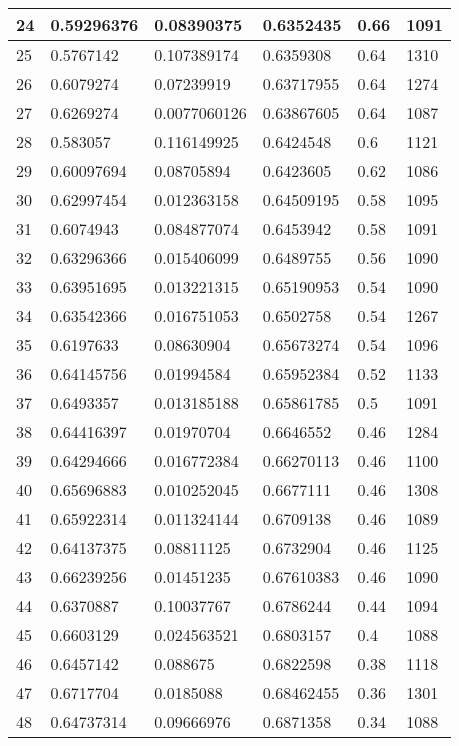\begin{longtable}{|l|l|l|l|l|l|}
24 & 0.59296376 & 0.08390375 & 0.6352435 & 0.66 & 1091 \\ \hline 
25 & 0.5767142 & 0.107389174 & 0.6359308 & 0.64 & 1310 \\ \hline 
26 & 0.6079274 & 0.07239919 & 0.63717955 & 0.64 & 1274 \\ \hline 
27 & 0.6269274 & 0.0077060126 & 0.63867605 & 0.64 & 1087 \\ \hline 
28 & 0.583057 & 0.116149925 & 0.6424548 & 0.6 & 1121 \\ \hline 
29 & 0.60097694 & 0.08705894 & 0.6423605 & 0.62 & 1086 \\ \hline 
30 & 0.62997454 & 0.012363158 & 0.64509195 & 0.58 & 1095 \\ \hline 
31 & 0.6074943 & 0.084877074 & 0.6453942 & 0.58 & 1091 \\ \hline 
32 & 0.63296366 & 0.015406099 & 0.6489755 & 0.56 & 1090 \\ \hline 
33 & 0.63951695 & 0.013221315 & 0.65190953 & 0.54 & 1090 \\ \hline 
34 & 0.63542366 & 0.016751053 & 0.6502758 & 0.54 & 1267 \\ \hline 
35 & 0.6197633 & 0.08630904 & 0.65673274 & 0.54 & 1096 \\ \hline 
36 & 0.64145756 & 0.01994584 & 0.65952384 & 0.52 & 1133 \\ \hline 
37 & 0.6493357 & 0.013185188 & 0.65861785 & 0.5 & 1091 \\ \hline 
38 & 0.64416397 & 0.01970704 & 0.6646552 & 0.46 & 1284 \\ \hline 
39 & 0.64294666 & 0.016772384 & 0.66270113 & 0.46 & 1100 \\ \hline 
40 & 0.65696883 & 0.010252045 & 0.6677111 & 0.46 & 1308 \\ \hline 
41 & 0.65922314 & 0.011324144 & 0.6709138 & 0.46 & 1089 \\ \hline 
42 & 0.64137375 & 0.08811125 & 0.6732904 & 0.46 & 1125 \\ \hline 
43 & 0.66239256 & 0.01451235 & 0.67610383 & 0.46 & 1090 \\ \hline 
44 & 0.6370887 & 0.10037767 & 0.6786244 & 0.44 & 1094 \\ \hline 
45 & 0.6603129 & 0.024563521 & 0.6803157 & 0.4 & 1088 \\ \hline 
46 & 0.6457142 & 0.088675 & 0.6822598 & 0.38 & 1118 \\ \hline 
47 & 0.6717704 & 0.0185088 & 0.68462455 & 0.36 & 1301 \\ \hline 
48 & 0.64737314 & 0.09666976 & 0.6871358 & 0.34 & 1088 \\ \hline 

\end{longtable}
